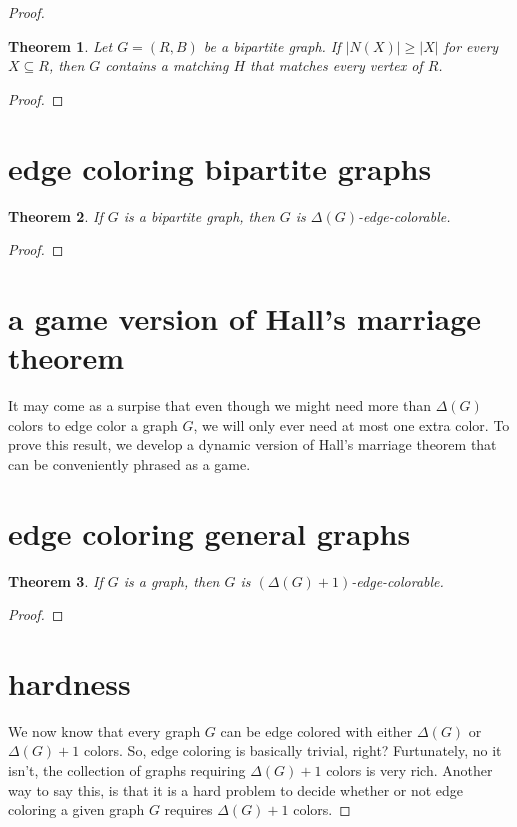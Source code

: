 \documentclass{amsbook}
\theoremstyle{plain}
\newtheorem{theorem}{Theorem}
\numberwithin{equation}{chapter}
\newcommand{\card}[1]{\left|#1\right|}
\newcommand{\parens}[1]{\left( #1 \right)}
\begin{document}
\begin{proof}
\begin{theorem}\label{HallsMarriageTheorem}
Let $G = (R,B)$ be a bipartite graph.  If $\card{N(X)} \ge \card{X}$ for every $X \subseteq R$, then $G$ contains a matching $H$ that matches
every vertex of $R$.
\end{theorem}
\begin{proof}
\end{proof}

\section*{edge coloring bipartite graphs}

\begin{theorem}\label{DeltaEdgeColoring}
If $G$ is a bipartite graph, then $G$ is $\Delta(G)$-edge-colorable.
\end{theorem}
\begin{proof}
\end{proof}

\section*{a game version of Hall's marriage theorem}
It may come as a surpise that even though we might need more than $\Delta(G)$ colors to edge color a graph $G$, we will only ever need at most one extra color.
To prove this result, we develop a dynamic version of Hall's marriage theorem that can be conveniently phrased as a game.


\section*{edge coloring general graphs}

\begin{theorem}\label{VizingsTheorem}
If $G$ is a graph, then $G$ is $\parens{\Delta(G) + 1}$-edge-colorable.
\end{theorem}
\begin{proof}
\end{proof}

\section*{hardness}
We now know that every graph $G$ can be edge colored with either $\Delta(G)$ or $\Delta(G) + 1$ colors.  So, edge coloring is basically trivial, right?
Furtunately, no it isn't, the collection of graphs requiring $\Delta(G) + 1$ colors is very rich.  Another way to say this, is that it is a hard problem
to decide whether or not edge coloring a given graph $G$ requires $\Delta(G) + 1$ colors.


\end{proof}
\end{document}
